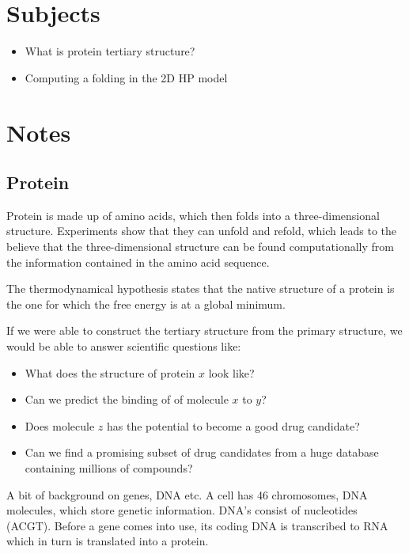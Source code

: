 


    \section{Subjects}
    \begin{itemize}
        \item What is protein tertiary structure?
        \item Computing a folding in the 2D HP model
    \end{itemize}
    
    \section{Notes}
    
    \subsection{Protein}
    Protein is made up of amino acids, which then folds into a 
    three-dimensional structure. Experiments show that they can unfold and 
    refold, which leads to the believe that the three-dimensional structure can 
    be found computationally from the information contained in the amino acid 
    sequence.
    
    The thermodynamical hypothesis states that the native structure of a 
    protein is the one for which the free energy is at a global minimum.
    
    If we were able to construct the tertiary structure from the primary 
    structure, we would be able to answer scientific questions like:
    \begin{itemize}
        \item What does the structure of protein $x$ look like?
        \item Can we predict the binding of of molecule $x$ to $y$?
        \item Does molecule $z$ has the potential to become a good drug 
        candidate?
        \item Can we find a promising subset of drug candidates from a huge 
        database containing millions of compounds?
    \end{itemize}
    
    A bit of background on genes, DNA etc. A cell has 46 chromosomes, DNA 
    molecules, which store genetic information. DNA's consist of nucleotides 
    (ACGT). Before a gene comes into use, its coding DNA is transcribed to RNA 
    which in turn is translated into a protein.
    
